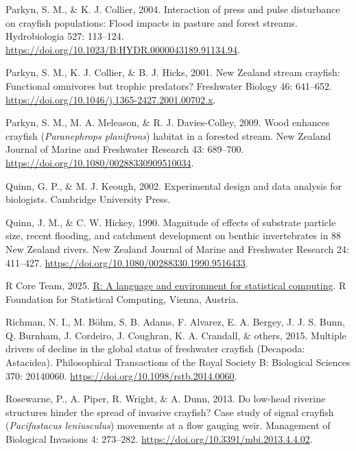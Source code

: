 \documentclass[
  letterpaper,
  DIV=11,
  numbers=noendperiod]{scrartcl}
\newlength{\cslhangindent}
\newenvironment{CSLReferences}[2] %
 {\begin{list}{}{%
  \setlength{\itemindent}{0pt}
  \setlength{\leftmargin}{0pt}
  \setlength{\parsep}{0pt}
  \ifodd #1
   \setlength{\leftmargin}{\cslhangindent}
   \setlength{\itemindent}{-1\cslhangindent}
  \fi
  \setlength{\itemsep}{#2\baselineskip}}}
 {\end{list}}
\begin{document}
\begin{CSLReferences}{0}{1}
Parkyn, S. M., \& K. J. Collier, 2004. Interaction of press and pulse
disturbance on crayfish populations: Flood impacts in pasture and forest
streams. Hydrobiologia 527: 113--124.
\url{https://doi.org/10.1023/B:HYDR.0000043189.91134.94}.

Parkyn, S. M., K. J. Collier, \& B. J. Hicks, 2001. {New Zealand} stream
crayfish: Functional omnivores but trophic predators? Freshwater Biology
46: 641--652. \url{https://doi.org/10.1046/j.1365-2427.2001.00702.x}.

Parkyn, S. M., M. A. Meleason, \& R. J. Davies-Colley, 2009. Wood
enhances crayfish ({\emph{Paranephrops planifrons}}) habitat in a
forested stream. New Zealand Journal of Marine and Freshwater Research
43: 689--700. \url{https://doi.org/10.1080/00288330909510034}.

Quinn, G. P., \& M. J. Keough, 2002. Experimental design and data
analysis for biologists. Cambridge University Press.

Quinn, J. M., \& C. W. Hickey, 1990. Magnitude of effects of substrate
particle size, recent flooding, and catchment development on benthic
invertebrates in 88 {New Zealand} rivers. New Zealand Journal of Marine
and Freshwater Research 24: 411--427.
\url{https://doi.org/10.1080/00288330.1990.9516433}.

R Core Team, 2025. \href{https://www.R-project.org/}{{R}: A language and
environment for statistical computing}. R Foundation for Statistical
Computing, Vienna, Austria.

{Richman, N. I., M. Böhm, S. B. Adams, F. Alvarez, E. A. Bergey, J. J.
S. Bunn, Q. Burnham, J. Cordeiro, J. Coughran, K. A. Crandall, \&
others}, 2015. Multiple drivers of decline in the global status of
freshwater crayfish ({Decapoda}: {Astacidea}). Philosophical
Transactions of the Royal Society B: Biological Sciences 370: 20140060.
\url{https://doi.org/10.1098/rstb.2014.0060}.

Rosewarne, P., A. Piper, R. Wright, \& A. Dunn, 2013. Do low-head
riverine structures hinder the spread of invasive crayfish? Case study
of signal crayfish ({\emph{Pacifastacus leniusculus}}) movements at a
flow gauging weir. Management of Biological Invasions 4: 273--282.
\url{https://doi.org/10.3391/mbi.2013.4.4.02}.


\end{CSLReferences}
\end{document}
